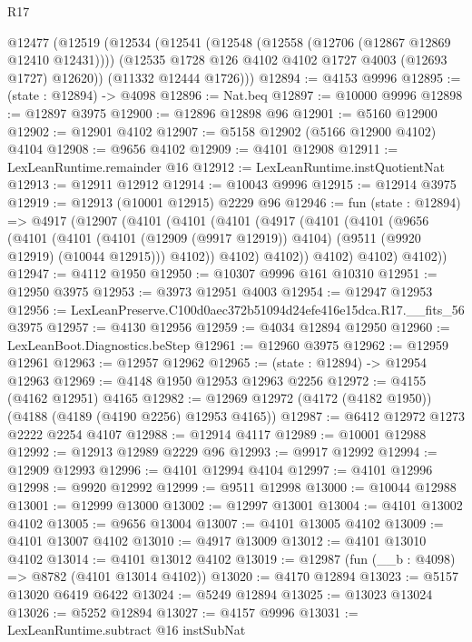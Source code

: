 \begin{lexlean}{R17}
\begin{coremodule}
  @12477
    (@12519
      (@12534
        (@12541
          (@12548 (@12558 (@12706 (@12867 @12869 @12410 @12431))))
          (@12535 @1728 @126 @4102 @4102 @1727 @4003 (@12693 @1727) @12620))
        (@11332 @12444 @1726)))
@12894 := @4153 @9996
@12895 := (state : @12894) -> @4098
@12896 := Nat.beq
@12897 := @10000 @9996
@12898 := @12897 @3975
@12900 := @12896 @12898 @96
@12901 := @5160 @12900
@12902 := @12901 @4102
@12907 := @5158 @12902 (@5166 @12900 @4102) @4104
@12908 := @9656 @4102
@12909 := @4101 @12908
@12911 := LexLeanRuntime.remainder @16
@12912 := LexLeanRuntime.instQuotientNat
@12913 := @12911 @12912
@12914 := @10043 @9996
@12915 := @12914 @3975
@12919 := @12913 (@10001 @12915) @2229 @96
@12946 := fun (state : @12894) =>
  @4917
    (@12907
      (@4101
        (@4101
          (@4101
            (@4917
              (@4101
                (@4101
                  (@9656
                    (@4101
                      (@4101
                        (@4101 (@12909 (@9917 @12919)) @4104)
                        (@9511 (@9920 @12919) (@10044 @12915)))
                      @4102))
                  @4102)
                @4102))
            @4102)
          @4102)
        @4102))
@12947 := @4112 @1950
@12950 := @10307 @9996 @161 @10310
@12951 := @12950 @3975
@12953 := @3973 @12951 @4003
@12954 := @12947 @12953
@12956 := LexLeanPreserve.C100d0aec372b51094d24efe416e15dca.R17.__fits_56 @3975
@12957 := @4130 @12956
@12959 := @4034 @12894 @12950
@12960 := LexLeanBoot.Diagnostics.beStep
@12961 := @12960 @3975
@12962 := @12959 @12961
@12963 := @12957 @12962
@12965 := (state : @12894) -> @12954 @12963
@12969 := @4148 @1950 @12953 @12963 @2256
@12972 := @4155 (@4162 @12951) @4165
@12982 := @12969 @12972 (@4172 (@4182 @1950)) (@4188 (@4189 (@4190 @2256) @12953 @4165))
@12987 := @6412 @12972 @1273 @2222 @2254 @4107
@12988 := @12914 @4117
@12989 := @10001 @12988
@12992 := @12913 @12989 @2229 @96
@12993 := @9917 @12992
@12994 := @12909 @12993
@12996 := @4101 @12994 @4104
@12997 := @4101 @12996
@12998 := @9920 @12992
@12999 := @9511 @12998
@13000 := @10044 @12988
@13001 := @12999 @13000
@13002 := @12997 @13001
@13004 := @4101 @13002 @4102
@13005 := @9656 @13004
@13007 := @4101 @13005 @4102
@13009 := @4101 @13007 @4102
@13010 := @4917 @13009
@13012 := @4101 @13010 @4102
@13014 := @4101 @13012 @4102
@13019 := @12987 (fun (__b : @4098) => @8782 (@4101 @13014 @4102))
@13020 := @4170 @12894
@13023 := @5157 @13020 @6419 @6422
@13024 := @5249 @12894
@13025 := @13023 @13024
@13026 := @5252 @12894
@13027 := @4157 @9996
@13031 := LexLeanRuntime.subtract @16 instSubNat

\end{coremodule}
\end{lexlean}
